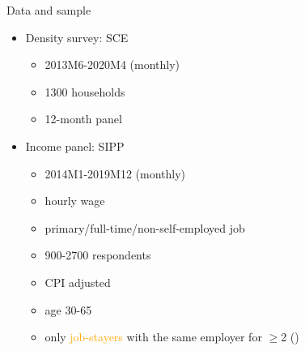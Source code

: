 \documentclass{beamer}
\begin{document}
\begin{frame}{Data and sample}
	\begin{itemize}
		\item Density survey: SCE
		\begin{itemize}
			\item 2013M6-2020M4   (monthly)
			\item 1300 households 
			\item 12-month panel 
		\end{itemize}
\item Income panel: SIPP
\begin{itemize}
	\item 2014M1-2019M12 (monthly)
	\item hourly wage 
	\item primary/full-time/non-self-employed job 
	\item 900-2700 respondents 
		\item CPI adjusted 
	\item age 30-65 
	\item only \textcolor{orange}{job-stayers} with the same employer for $\geq$2  (\cite{low2010wage})
	

\end{itemize}
\end{itemize}
\end{frame}


\end{document}

